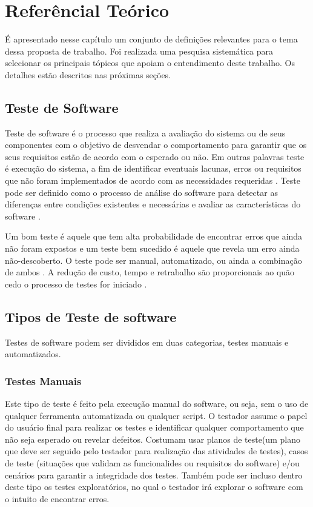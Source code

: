 \chapter{Referêncial Teórico}

É apresentado nesse capítulo um conjunto de definições relevantes para o tema dessa proposta de trabalho. Foi realizada uma pesquisa sistemática para selecionar os principais tópicos que apoiam o entendimento deste trabalho. Os detalhes estão descritos nas próximas seções.

\section{Teste de Software}

Teste de software é o processo que realiza a avaliação do sistema ou de seus componentes com o objetivo de desvendar o comportamento para garantir que os seus requisitos estão de acordo com o esperado ou não. Em outras palavras teste é execução do sistema, a fim de identificar eventuais lacunas, erros ou requisitos que não foram implementados de acordo com as necessidades requeridas \cite{tutorialsPoint}. Teste pode ser definido como o processo de análise do software para detectar as diferenças entre condições existentes e necessárias e avaliar as características do software \cite{ansiieee1059}.

Um bom teste é aquele que tem alta probabilidade de encontrar erros que ainda não foram expostos e um teste bem sucedido é aquele que revela um erro ainda não-descoberto. O teste pode ser manual, automatizado, ou ainda a combinação de ambos \cite{Pressman2002}. A redução de custo, tempo e retrabalho são proporcionais ao quão cedo o processo de testes for iniciado \cite{tutorialsPoint}.

\section{Tipos de Teste de software}

Testes de software podem ser divididos em duas categorias, testes manuais e automatizados.

\subsection{Testes Manuais}

		Este tipo de teste é feito pela execução manual do software, ou seja, sem o uso de qualquer ferramenta automatizada ou qualquer script. O testador assume o papel do usuário final para realizar os testes e identificar qualquer comportamento que não seja esperado ou revelar defeitos. Costumam usar planos de teste(um plano que deve ser seguido pelo testador para realização das atividades de testes), casos de teste (situações que validam as funcionalides ou requisitos do software) e/ou cenários para garantir a integridade dos testes. Também pode ser incluso dentro deste tipo os testes exploratórios, no qual o testador irá explorar o software com o intuito de encontrar erros\cite{tutorialsPoint}.
		
